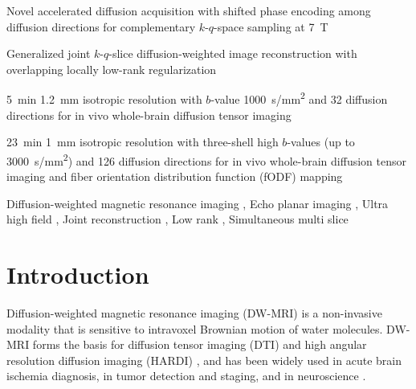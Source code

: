 \documentclass[preprint,12pt,authoryear,review]{elsarticle}
\begin{document}
\begin{frontmatter}
        \begin{highlights}
            \item Novel accelerated diffusion acquisition
            with shifted phase encoding among diffusion directions
            for complementary $k$-$q$-space sampling at \SI{7}{\tesla}

            \item Generalized joint $k$-$q$-slice
            diffusion-weighted image reconstruction
            with overlapping locally low-rank regularization

            \item \SI{5}{min} \SI{1.2}{mm} isotropic resolution
            with $b$-value \SI{1000}{s/mm^2} and 32 diffusion directions
            for in vivo whole-brain diffusion tensor imaging

            \item \SI{23}{min} \SI{1}{mm} isotropic resolution
            with three-shell high $b$-values (up to \SI{3000}{s/mm^2})
            and 126 diffusion directions
            for in vivo whole-brain diffusion tensor imaging
            and fiber orientation distribution function (fODF) mapping
        \end{highlights}

        \begin{keyword}
            Diffusion-weighted magnetic resonance imaging \sep
            Echo planar imaging \sep
            Ultra high field \sep
            Joint reconstruction \sep
            Low rank \sep
            Simultaneous multi slice
        \end{keyword}

    \end{frontmatter}

    \pagebreak
    \linenumbers

    \section{Introduction}
    \label{SEC:Intr}

    Diffusion-weighted magnetic resonance imaging (DW-MRI)
    \citep{lebihan_1986_diff,merboldt_1985_diff} is a non-invasive modality
    that is sensitive to intravoxel Brownian motion of water molecules.
    DW-MRI forms the basis for diffusion tensor imaging (DTI) \citep{basser_1994_dmri,mori_2001_track}
    and high angular resolution diffusion imaging (HARDI) \citep{tuch_2002_hardi},
    and has been widely used in acute brain ischemia diagnosis, in tumor detection and staging,
    and in neuroscience \citep{jones_2010_diff}.
\end{document}
